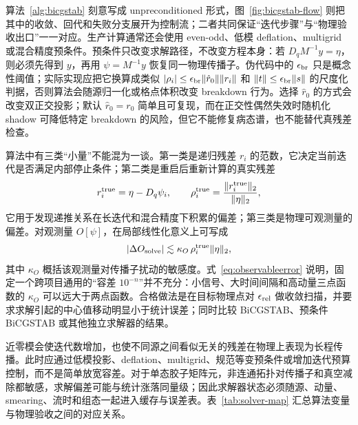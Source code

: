 \documentclass[UTF8,12pt,a4paper,twoside,openany]{ctexbook}
\begin{document}
算法~\ref{alg:bicgstab} 刻意写成 unpreconditioned 形式，图~\ref{fig:bicgstab-flow} 则把其中的收敛、回代和失败分支展开为控制流；二者共同保证“迭代步骤”与“物理验收出口”一一对应。生产计算通常还会使用 even-odd、低模 deflation、multigrid 或混合精度预条件。预条件只改变求解路径，不改变方程本身：若 \(D_qM^{-1}y=\eta\)，则必须先得到 \(y\)，再用 \(\psi=M^{-1}y\) 恢复同一物理传播子。伪代码中的 \(\epsilon_{\rm br}\) 只是概念性阈值；实际实现应把它换算成类似 \(|\rho_i|\le\epsilon_{\rm br}\|\hat r_0\|\|r_i\|\) 和 \(\|t\|\le\epsilon_{\rm br}\|s\|\) 的尺度化判据，否则算法会随源归一化或格点体积改变 breakdown 行为。选择 \(\hat r_0\) 的方式会改变双正交投影；默认 \(\hat r_0=r_0\) 简单且可复现，而在正交性偶然失效时随机化 shadow 可降低特定 breakdown 的风险\cite{Schoutrop2022}，但它不能修复病态谱，也不能替代真残差检查。

算法中有三类“小量”不能混为一谈。第一类是递归残差 \(r_i\) 的范数，它决定当前迭代是否满足内部停止条件；第二类是重启后重新计算的真实残差
\begin{equation}
  r_i^{\rm true}=\eta-D_q\psi_i,
  \qquad
  \rho_i^{\rm true}=\frac{\|r_i^{\rm true}\|_2}{\|\eta\|_2},
  \label{eq:trueresidual}
\end{equation}
它用于发现递推关系在长迭代和混合精度下积累的偏差；第三类是物理可观测量的偏差。对观测量 \(O[\psi]\)，在局部线性化意义上可写成
\begin{equation}
  |\Delta O_{\rm solve}|
  \lesssim \kappa_O\,\rho_i^{\rm true}\|\eta\|_2,
  \label{eq:observableerror}
\end{equation}
其中 \(\kappa_O\) 概括该观测量对传播子扰动的敏感度。式~\eqref{eq:observableerror} 说明，固定一个跨项目通用的“容差 \(10^{-n}\)”并不充分：小信号、大时间间隔和高动量三点函数的 \(\kappa_O\) 可以远大于两点函数。合格做法是在目标物理点对 \(\epsilon_{\rm rel}\) 做收敛扫描，并要求求解引起的中心值移动明显小于统计误差；同时比较 BiCGSTAB、预条件 BiCGSTAB 或其他独立求解器的结果。

近零模会使迭代数增加，也使不同源之间看似无关的残差在物理上表现为长程传播。此时应通过低模投影、deflation、multigrid、规范等变预条件或增加迭代预算控制，而不是简单放宽容差。对于单态胶子矩阵元，非连通拓扑对传播子和真空减除都敏感，求解偏差可能与统计涨落同量级；因此求解器状态必须随源、动量、smearing、流时和组态一起进入缓存与误差表。表~\ref{tab:solver-map} 汇总算法变量与物理验收之间的对应关系。
\end{document}
